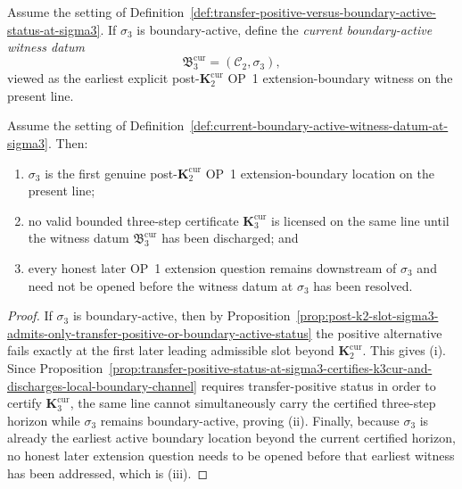 \begin{definition}
\label{def:current-boundary-active-witness-datum-at-sigma3}
Assume the setting of Definition~\ref{def:transfer-positive-versus-boundary-active-status-at-sigma3}. If $\sigma_3$ is boundary-active, define the \emph{current boundary-active witness datum}
\[
  \mathfrak B_3^{\mathrm{cur}}=(\mathcal C_2,\sigma_3),
\]
viewed as the earliest explicit post-$\mathbf K_2^{\mathrm{cur}}$ OP~1 extension-boundary witness on the present line.
\end{definition}

\begin{proposition}
\label{prop:boundary-active-status-at-sigma3-normalizes-earliest-explicit-post-k2cur-extension-witness}
Assume the setting of Definition~\ref{def:current-boundary-active-witness-datum-at-sigma3}. Then:
\begin{enumerate}[label=(\roman*)]
  \item $\sigma_3$ is the first genuine post-$\mathbf K_2^{\mathrm{cur}}$ OP~1 extension-boundary location on the present line;
  \item no valid bounded three-step certificate $\mathbf K_3^{\mathrm{cur}}$ is licensed on the same line until the witness datum $\mathfrak B_3^{\mathrm{cur}}$ has been discharged; and
  \item every honest later OP~1 extension question remains downstream of $\sigma_3$ and need not be opened before the witness datum at $\sigma_3$ has been resolved.
\end{enumerate}
\end{proposition}

\begin{proof}
If $\sigma_3$ is boundary-active, then by Proposition~\ref{prop:post-k2-slot-sigma3-admits-only-transfer-positive-or-boundary-active-status} the positive alternative fails exactly at the first later leading admissible slot beyond $\mathbf K_2^{\mathrm{cur}}$. This gives (i). Since Proposition~\ref{prop:transfer-positive-status-at-sigma3-certifies-k3cur-and-discharges-local-boundary-channel} requires transfer-positive status in order to certify $\mathbf K_3^{\mathrm{cur}}$, the same line cannot simultaneously carry the certified three-step horizon while $\sigma_3$ remains boundary-active, proving (ii). Finally, because $\sigma_3$ is already the earliest active boundary location beyond the current certified horizon, no honest later extension question needs to be opened before that earliest witness has been addressed, which is (iii).
\end{proof}

